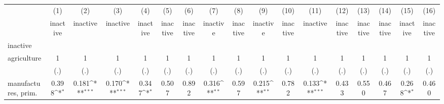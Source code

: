{
\def\sym#1{\ifmmode^{#1}\else\(^{#1}\)\fi}
\begin{tabular}{l*{16}{c}}
\hline\hline
                    &\multicolumn{1}{c}{(1)}&\multicolumn{1}{c}{(2)}&\multicolumn{1}{c}{(3)}&\multicolumn{1}{c}{(4)}&\multicolumn{1}{c}{(5)}&\multicolumn{1}{c}{(6)}&\multicolumn{1}{c}{(7)}&\multicolumn{1}{c}{(8)}&\multicolumn{1}{c}{(9)}&\multicolumn{1}{c}{(10)}&\multicolumn{1}{c}{(11)}&\multicolumn{1}{c}{(12)}&\multicolumn{1}{c}{(13)}&\multicolumn{1}{c}{(14)}&\multicolumn{1}{c}{(15)}&\multicolumn{1}{c}{(16)}\\
                    &\multicolumn{1}{c}{inactive}&\multicolumn{1}{c}{inactive}&\multicolumn{1}{c}{inactive}&\multicolumn{1}{c}{inactive}&\multicolumn{1}{c}{inactive}&\multicolumn{1}{c}{inactive}&\multicolumn{1}{c}{inactive}&\multicolumn{1}{c}{inactive}&\multicolumn{1}{c}{inactive}&\multicolumn{1}{c}{inactive}&\multicolumn{1}{c}{inactive}&\multicolumn{1}{c}{inactive}&\multicolumn{1}{c}{inactive}&\multicolumn{1}{c}{inactive}&\multicolumn{1}{c}{inactive}&\multicolumn{1}{c}{inactive}\\
\hline
inactive            &                     &                     &                     &                     &                     &                     &                     &                     &                     &                     &                     &                     &                     &                     &                     &                     \\
agriculture         &           1         &           1         &           1         &           1         &           1         &           1         &           1         &           1         &           1         &           1         &           1         &           1         &           1         &           1         &           1         &           1         \\
                    &         (.)         &         (.)         &         (.)         &         (.)         &         (.)         &         (.)         &         (.)         &         (.)         &         (.)         &         (.)         &         (.)         &         (.)         &         (.)         &         (.)         &         (.)         &         (.)         \\
[1em]
manufactures, prim. &       0.398\sym{*}  &       0.181\sym{***}&       0.170\sym{***}&       0.347\sym{*}  &       0.507         &       0.892         &       0.316\sym{**} &       0.597         &       0.215\sym{**} &       0.782         &       0.133\sym{***}&       0.433         &       0.550         &       0.467         &       0.268\sym{*}  &       0.460         \\

\end{tabular}}
